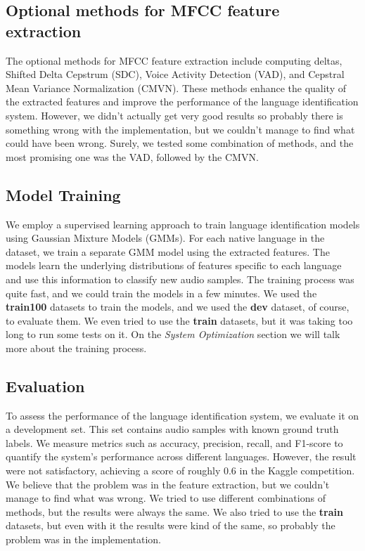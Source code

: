 \documentclass{Interspeech2024}
\begin{document}
\subsection{Optional methods for MFCC feature extraction}

The optional methods for MFCC feature extraction include computing deltas,
Shifted Delta Cepstrum (SDC), Voice Activity Detection (VAD), and Cepstral Mean
Variance Normalization (CMVN). These methods enhance the quality of the extracted
features and improve the performance of the language identification system.
However, we didn't actually get very good results so probably there is something
wrong with the implementation, but we couldn't manage to find what could have been wrong.
Surely, we tested some combination of methods, and the most promising one was the
VAD, followed by the CMVN.


\subsection{Model Training}

We employ a supervised learning approach to train language identification
models using Gaussian Mixture Models (GMMs). For each native language in the
dataset, we train a separate GMM model using the extracted features. The models
learn the underlying distributions of features specific to each language and use
this information to classify new audio samples. 
The training process was quite fast, and we could train the models in a few
minutes. We used the \textbf{train100} datasets to train the models, and we
used the \textbf{dev} dataset, of course, to evaluate them. We even tried to use the \textbf{train}
datasets, but it was taking too long to run some tests on it. On the \textit{System Optimization} section we will talk more about the training process.


\subsection{Evaluation}
To assess the performance of the language identification system, we evaluate it
on a development set. This set contains audio samples with known ground truth
labels. We measure metrics such as accuracy, precision, recall, and F1-score to
quantify the system's performance across different languages. However, the
result were not satisfactory, achieving a score of roughly 0.6 in the Kaggle
competition. We believe that the problem was in the feature extraction, but we
couldn't manage to find what was wrong. We tried to use different combinations
of methods, but the results were always the same. We also tried to use the
\textbf{train} datasets, but even with it the results were kind of the same, so probably 
the problem was in the implementation.
\end{document}
